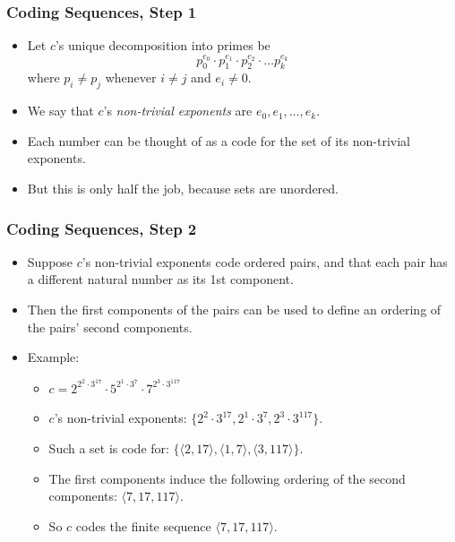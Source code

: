 \begin{frame}
\frametitle{Coding Sequences, Step 1}

\begin{itemize}[<+->]

\item Let $c$'s unique decomposition into primes be 
$$p_0^{e_0} \cdot p_1^{e_1} \cdot p_2^{e_2} \cdot \ldots p_k^{e_k}$$
where $p_i \neq p_j$ whenever $i \neq j$ and $e_i \neq 0$.


\item We say that $c$'s \emph{non-trivial exponents} are $e_0, e_1, \dots, e_k$.


\item Each number can be thought of as a code for the set of its non-trivial exponents.

\item But this is only half the job, because sets are unordered.

\end{itemize}
\end{frame}

\begin{frame}
\frametitle{Coding Sequences, Step 2}

\begin{itemize}[<+->]

\item Suppose $c$'s non-trivial exponents code ordered pairs, and that each pair has a different natural number as its 1st component. 

\item Then the first components of the pairs can be used to define an ordering of the pairs' second components.

\item Example:

\begin{itemize}


\item \(c= 2^{2^2 \cdot 3^{17}} \cdot 5^{2^1 \cdot 3^7} \cdot 7^{2^3 \cdot 3^{117}}\)

\item \(c\)'s non-trivial exponents: $\{2^2 \cdot 3^{17},2^1 \cdot 3^7,2^3 \cdot 3^{117}\}$. 


\item Such a set is code for: \(\{\langle 2,17 \rangle, \langle 1,7 \rangle, \langle 3,117 \rangle\}\).

\item The first components induce the following ordering of the second components: \(\langle 7,17,117\rangle\).

\item So $c$ codes the finite sequence  \(\langle 7,17,117\rangle\).

\end{itemize}

\end{itemize}
\end{frame}

